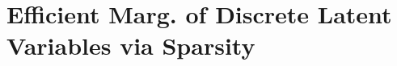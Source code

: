 \documentclass[xetex,aspectratio=169,xcolor,professionalfonts,hyperref]{beamer}
\begin{document}
\begin{frame}[fragile]
\begin{columns}[T]
\begin{column}{.33\textwidth}
            \centering
        \end{column}
    \end{columns}

\end{frame}

\section{Efficient Marg. of Discrete Latent Variables via Sparsity}
\end{document}
